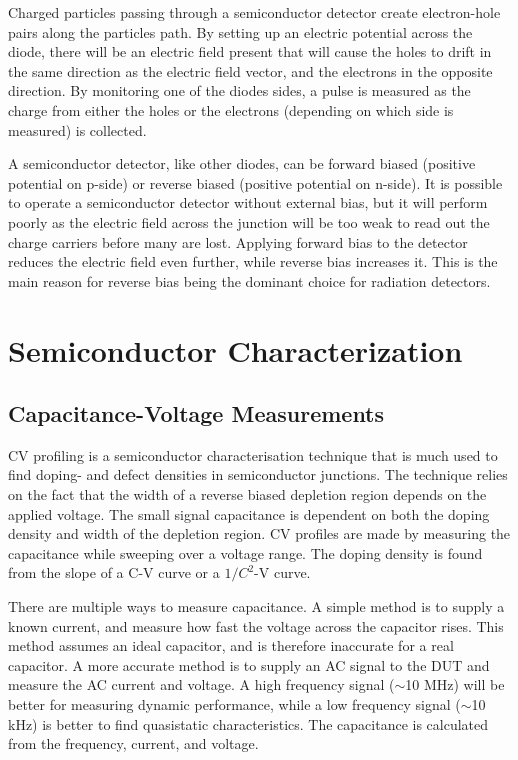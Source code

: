 \documentclass[../main/thesis.tex]{subfiles}
\begin{document}
Charged particles passing through a semiconductor detector create electron-hole pairs along the particles path. By setting up an electric potential across the diode, there will be an electric field present that will cause the holes to drift in the same direction as the electric field vector, and the electrons in the opposite direction. By monitoring one of the diodes sides, a pulse is measured as the charge from either the holes or the electrons (depending on which side is measured) is collected. 

A semiconductor detector, like other diodes, can be forward biased (positive potential on p-side) or reverse biased (positive potential on n-side). It is possible to operate a semiconductor detector without external bias, but it will perform poorly as the electric field across the junction will be too weak to read out the charge carriers before many are lost. Applying forward bias to the detector reduces the electric field even further, while reverse bias increases it. This is the main reason for reverse bias being the dominant choice for radiation detectors. \citep[chap. 11]{Knoll}




\section{Semiconductor Characterization}
\label{t-char}

\subsection{Capacitance-Voltage Measurements}
\label{t-cv}
\gls{CV} profiling is a semiconductor characterisation technique that is much used to find doping- and defect densities in semiconductor junctions. The technique relies on the fact that the width of a reverse biased depletion region depends on the applied voltage. The small signal capacitance is dependent on both the doping density and width of the depletion region. \gls{CV} profiles are made by measuring the capacitance while sweeping over a voltage range. The doping density is found from the slope of a C-V curve or a $1/C^2$-V curve. \citep[chap. 2]{Schroder}

There are multiple ways to measure capacitance. A simple method is to supply a known current, and measure how fast the voltage across the capacitor rises. This method assumes an ideal capacitor, and is therefore inaccurate for a real capacitor. A more accurate method is to supply an AC signal to the \gls{DUT} and measure the AC current and voltage. A high frequency signal ($\sim$10 MHz) will be better for measuring dynamic performance, while a low frequency signal ($\sim$10 kHz) is better to find quasistatic characteristics. The capacitance is calculated from the frequency, current, and voltage. 
\end{document}
